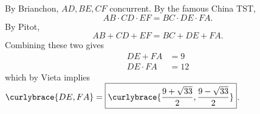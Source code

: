 By Brianchon, $AD,BE,CF$ concurrent. By the famous China TST, \[AB\cdot CD\cdot EF=BC\cdot DE\cdot FA.\] By Pitot, \[AB+CD+EF=BC+DE+FA.\] Combining these two gives
\begin{align*}
DE+FA&=9\\
DE\cdot FA&=12
\end{align*}
which by Vieta implies $\curlybrace{DE,FA}=\boxed{\curlybrace{\frac{9+\sqrt{33}}{2},\frac{9-\sqrt{33}}{2}}}$.